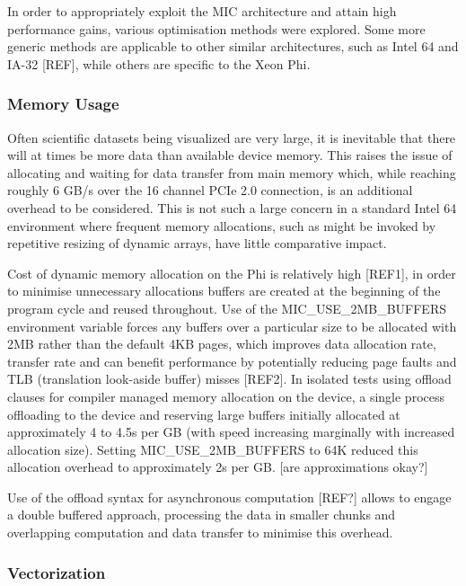 \documentclass[runningheads,a4paper]{llncs}
\begin{document}
In order to appropriately exploit the MIC architecture and attain high performance gains, various optimisation methods 
were explored. Some more generic methods are applicable to other similar architectures, such as Intel 64 and IA-32 [REF], while 
others are specific to the Xeon Phi. 

\subsubsection{Memory Usage}
\label{sect:memusage}

Often scientific datasets being visualized are very large, it is inevitable that there will at times be more data than 
available device memory. This raises the issue of allocating and waiting for data transfer from main memory which, 
while reaching roughly 6 GB/s over the 16 channel PCIe 2.0 connection, is an additional overhead to be considered.
This is not such a large concern in a standard Intel 64 environment where frequent memory allocations, such as might be 
invoked by repetitive resizing of dynamic arrays, have little comparative impact.

Cost of dynamic memory allocation on the Phi is relatively high [REF1], in order to minimise unnecessary allocations 
buffers are created at the beginning of the program cycle and reused throughout. Use of the MIC\_USE\_2MB\_BUFFERS 
environment variable forces any buffers over a particular size to be allocated with 2MB rather than the default 4KB 
pages, which improves data allocation rate, transfer rate and can benefit performance by potentially reducing page 
faults and TLB (translation look-aside buffer) misses [REF2]. In isolated tests using offload clauses for compiler 
managed memory allocation on the device, a single process offloading to the device and reserving large buffers 
initially allocated at approximately 4 to 4.5s per GB (with speed increasing marginally with increased allocation size). 
Setting MIC\_USE\_2MB\_BUFFERS to 64K reduced this allocation overhead to approximately 2s per GB. [are approximations okay?]

Use of the offload syntax for asynchronous computation [REF?] allows to engage a double buffered approach, 
processing the data in smaller chunks and overlapping computation and data transfer to minimise this overhead.

\subsubsection{Vectorization}
\label{sect:vectorization}
\end{document}
